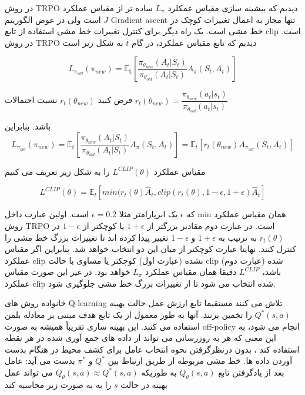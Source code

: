 در روش TRPO دیدیم که بیشینه سازی مقیاس عمکلرد $L_\pi$ ساده تر از مقیاس عملکرد $J$ است ولی در عوض الگوریتم Gradient ascent تنها مجاز به اعمال تغییرات کوچک در خط مشی است. یک راه دیگر برای کنترل تغییرات خط مشی استفاده از تابع clip است. در روش TRPO دیدیم که  تابع مقیاس عملکرد، در گام $t$ به شکل زیر است

$$L_{\pi_{old}}(\pi_{new}) = \mathbb{E_t}\left[\dfrac{\pi_{\theta_{new}}(A_t| S_t)}{\pi_{\theta_{old}}(A_t|S_t)} A_{\pi}(S_t, A_t)\right]$$

فرض کنید 
$r_t(\theta_{new})$
 نسبت احتمالات 
$r_t(\theta_{new}) = \dfrac{\pi_{\theta_{new}}(a_t|s_t)}{\pi_{\theta_{old}}(a_t|s_t)}$

باشد. بنابراین
$$L_{\pi_{old}}(\pi_{new}) = \mathbb{E}_t\left[\dfrac{\pi_{\theta_{new}}(A_t| S_t)}{\pi_{\theta_{old}}(A_t|S_t)} A_{\pi}(S_t, A_t)\right] = \mathbb{E}_t\left[r_t(\theta_{new}) A_{\pi_{old}}(S_t,A_t)\right]$$

مقیاس عملکرد 
$L^{CLIP}(\theta)$
را به شکل زیر تعریف می کنیم

$$L^{CLIP}(\theta) = \mathbb{E}_t\left[min(r_t(\theta) \hat{A}_t, clip(r_t(\theta), 1-\epsilon, 1+\epsilon) \hat{A}_t \right]$$

که $\epsilon$ یک ابرپارامتر  مثلا 
$\epsilon=0.2$
است. اولین عبارت داخل min همان مقیاس عملکرد روش TRPO است. در عبارت دوم مقادیر بزرگتر از $1+\epsilon$ یا کوچکتر از 
$1-\epsilon$
در $r_t(\theta)$ به ترتیب به $1+\epsilon$ و $1-\epsilon$ تغییر پیدا کرده اند تا تغییرات بزرگ خط مشی را کنترل کنند. نهایتا عبارت کوچکتر از میان این دو انتخاب خواهد شد. بنابراین اگر مقیاس عملکرد clip نشده (عبارت اول) کوچکتر یا مساوی با حالت clip شده (عبارت دوم) باشد، $L^{CLIP}$ دقیقا همان مقیاس عملکرد $L_\pi$ خواهد بود. در غیر این صورت مقیاس عملکرد clip شده انتخاب می شود تا از تغییرات بزرگ خط مشی جلوگیری شود.



خانواده روش های  Q-learning تلاش می کنند مستقیما تابع ارزش عمل-حالت بهینه $Q^*(s,a)$ را تخمین بزنند. آنها به طور معمول از یک تابع هدف مبتنی بر معادله بلمن استفاده می کنند. این بهینه سازی تقریباً همیشه به صورت off-policy انجام می شود، به این معنی که هر به روزرسانی می تواند از داده های جمع آوری شده در هر نقطه استفاده کند ، بدون درنظرگرفتن نحوه انتخاب عامل برای کشف محیط در هنگام بدست آوردن داده ها. خط مشی مربوطه از طریق ارتباط بین 
$Q^*$
و
$\pi^*$
 بدست می آید: عامل بعد از یادگرفتن تابع $Q_\theta(s,a)$ به طوریکه 
 $Q_\theta(s,a) \approx Q^*(s,a)$
می تواند عمل بهینه در حالت $s$ را به به صورت زیر محاسبه کند

